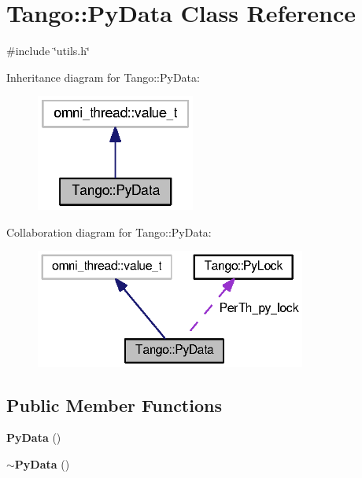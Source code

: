 \section{Tango\-:\-:Py\-Data Class Reference}
\label{classTango_1_1PyData}


{\ttfamily \#include \char`\"{}utils.\-h\char`\"{}}



Inheritance diagram for Tango\-:\-:Py\-Data\-:
\nopagebreak
\begin{figure}[H]
\begin{center}
\leavevmode
\includegraphics[width=148pt]{d1/d95/classTango_1_1PyData__inherit__graph}
\end{center}
\end{figure}


Collaboration diagram for Tango\-:\-:Py\-Data\-:
\nopagebreak
\begin{figure}[H]
\begin{center}
\leavevmode
\includegraphics[width=252pt]{d4/d33/classTango_1_1PyData__coll__graph}
\end{center}
\end{figure}
\subsection*{Public Member Functions}
\begin{DoxyCompactItemize}
\item 
{\bf Py\-Data} ()
\item 
{\bf $\sim$\-Py\-Data} ()
\end{DoxyCompactItemize}
